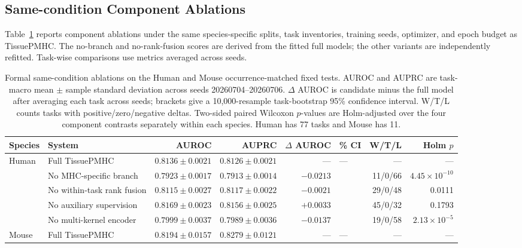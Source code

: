 \subsection{Same-condition Component Ablations}

Table~\ref{tab:component-evidence} reports component ablations under the same species-specific splits, task inventories, training seeds, optimizer, and epoch budget as TissuePMHC. The no-branch and no-rank-fusion scores are derived from the fitted full models; the other variants are independently refitted. Task-wise comparisons use metrics averaged across seeds.

\begin{table}[t]
\centering
\caption{Formal same-condition ablations on the Human and Mouse occurrence-matched fixed tests. AUROC and AUPRC are task-macro mean $\pm$ sample standard deviation across seeds 20260704--20260706. $\Delta$ AUROC is candidate minus the full model after averaging each task across seeds; brackets give a 10,000-resample task-bootstrap 95\% confidence interval. W/T/L counts tasks with positive/zero/negative deltas. Two-sided paired Wilcoxon $p$-values are Holm-adjusted over the four component contrasts separately within each species. Human has 77 tasks and Mouse has 11.}
\label{tab:component-evidence}
\fontsize{7.2}{8.2}\selectfont
\setlength{\tabcolsep}{1.8pt}
\begin{tabularx}{\textwidth}{@{}l>{\raggedright\arraybackslash}Xrrr>{\raggedleft\arraybackslash}p{2.35cm}rr@{}}
\toprule
Species & System & AUROC & AUPRC & $\Delta$ AUROC & 95\% CI & W/T/L & Holm $p$ \\
\midrule
Human & Full TissuePMHC & $0.8136\pm0.0021$ & $0.8126\pm0.0021$ & --- & --- & --- & --- \\
& No MHC-specific branch & $0.7923\pm0.0017$ & $0.7913\pm0.0014$ & $-0.0213$ & [$-0.0265,-0.0164$] & 11/0/66 & $4.45\times10^{-10}$ \\
& No within-task rank fusion & $0.8115\pm0.0027$ & $0.8117\pm0.0022$ & $-0.0021$ & [$-0.0036,-0.0007$] & 29/0/48 & 0.0111 \\
& No auxiliary supervision & $0.8169\pm0.0023$ & $0.8156\pm0.0025$ & $+0.0033$ & [$-0.0017,+0.0080$] & 45/0/32 & 0.1793 \\
& No multi-kernel encoder & $0.7999\pm0.0037$ & $0.7989\pm0.0036$ & $-0.0137$ & [$-0.0189,-0.0084$] & 19/0/58 & $2.13\times10^{-5}$ \\
\midrule
Mouse & Full TissuePMHC & $0.8194\pm0.0157$ & $0.8279\pm0.0121$ & --- & --- & --- & --- \\

\end{tabularx}
\end{table}
